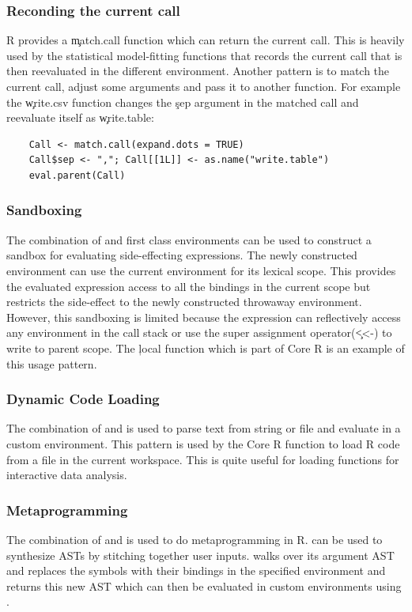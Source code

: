 \documentclass[conference]{IEEEtran}
\begin{document}
\subsubsection{Reconding the current call} R provides a \c{match.call} function
which can return the current call. This is heavily used by the statistical
model-fitting functions that records the current call that is then reevaluated
in the different environment. Another pattern is to match the current call,
adjust some arguments and pass it to another function. For example the
\c{write.csv} function changes the \c{sep} argument in the matched call and reevaluate itself as \c{write.table}:
%
\begin{lstlisting}
    Call <- match.call(expand.dots = TRUE)
    Call$sep <- ","; Call[[1L]] <- as.name("write.table")
    eval.parent(Call)
\end{lstlisting}

  \subsubsection{Sandboxing} The combination of \eval and first class
  environments can be used to construct a sandbox for evaluating side-effecting
  expressions. The newly constructed environment can use the current environment
  for its lexical scope. This provides the evaluated expression access to all the
  bindings in the current scope but restricts the side-effect to the newly
  constructed throwaway environment. However, this sandboxing is limited because
  the expression can reflectively access any environment in the call stack or use
  the super assignment operator(\c{<<-}) to write to parent scope. The \c{local}
  function which is part of Core R is an example of this usage pattern.

  \subsubsection{Dynamic Code Loading} The combination of \parse and \eval is
  used to parse text from string or file and evaluate in a custom environment.
  This pattern is used by the \source Core R function to load R code from a file
  in the current workspace. This is quite useful for loading functions for
  interactive data analysis.

  \subsubsection{Metaprogramming} The combination of \eval and \substitute is
  used to do metaprogramming in R. \substitute can be used to synthesize ASTs by
  stitching together user inputs. \substitute walks over its argument AST and
  replaces the symbols with their bindings in the specified environment and
  returns this new AST which can then be evaluated in custom environments using
  \eval.
\end{document}
